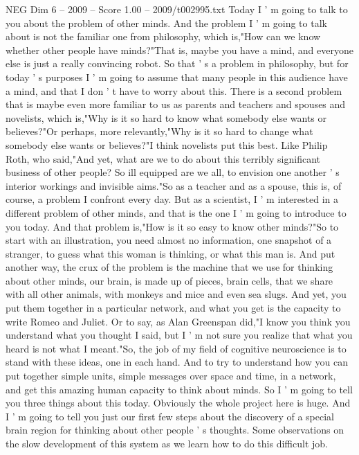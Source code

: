 \begin{textsample}{NEG Dim 6 – 2009 – Score 1.00 – 2009/t002995.txt}  \label{ex:f6_neg_048}
Today I ' m going to talk to you about the problem of other minds.
And the problem I ' m going to talk about is not the familiar one from philosophy, which is,"How can we know whether other people have minds?"That is, maybe you have a mind, and everyone else is just a really convincing robot.
So that ' s a problem in philosophy, but for today ' s purposes I ' m going to assume that many people in this audience have a mind, and that I don ' t have to worry about this.
There is a second problem that is maybe even more familiar to us as parents and teachers and spouses and novelists, which is,"Why is it so hard to know what somebody else wants or believes?"Or perhaps, more relevantly,"Why is it so hard to change what somebody else wants or believes?"I think novelists put this best.
Like Philip Roth, who said,"And yet, what are we to do about this terribly significant business of other people?
So ill equipped are we all, to envision one another ' s interior workings and invisible aims."So as a teacher and as a spouse, this is, of course, a problem I confront every day.
But as a scientist, I ' m interested in a different problem of other minds, and that is the one I ' m going to introduce to you today.
And that problem is,"How is it so easy to know other minds?"So to start with an illustration, you need almost no information, one snapshot of a stranger, to guess what this woman is thinking, or what this man is.
And put another way, the crux of the problem is the machine that we use for thinking about other minds, our brain, is made up of pieces, brain cells, that we share with all other animals, with monkeys and mice and even sea slugs.
And yet, you put them together in a particular network, and what you get is the capacity to write Romeo and Juliet.
Or to say, as Alan Greenspan did,"I know you think you understand what you thought I said, but I ' m not sure you realize that what you heard is not what I meant."So, the job of my field of cognitive neuroscience is to stand with these ideas, one in each hand.
And to try to understand how you can put together simple units, simple messages over space and time, in a network, and get this amazing human capacity to think about minds.
So I ' m going to tell you three things about this today.
Obviously the whole project here is huge.
And I ' m going to tell you just our first few steps about the discovery of a special brain region for thinking about other people ' s thoughts.
Some observations on the slow development of this system as we learn how to do this difficult job.

\end{textsample}
